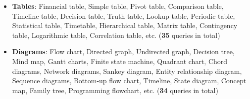 \begin{itemize}[noitemsep, topsep=0pt, leftmargin=*]
    
    \item \textbf{Tables}: Financial table, Simple table, Pivot table, Comparison table, Timeline table, Decision table, Truth table, Lookup table, Periodic table, Statistical table, Timetable, Hierarchical table, Matrix table, Contingency table, Logarithmic table, Correlation table, etc. (\textbf{35} queries in total)

    \item \textbf{Diagrams}: Flow chart, Directed graph, Undirected graph, Decision tree, Mind map, Gantt charts, Finite state machine, Quadrant chart, Chord diagrams, Network diagrams, Sankey diagram, Entity relationship diagram, Sequence diagrams, Bottom-up flow chart, Timeline, State diagram, Concept map, Family tree, Programming flowchart, etc. (\textbf{34} queries in total)


\end{itemize}

